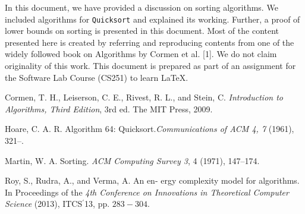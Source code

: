 \documentclass[a4paper, 10pt,twocolumn]{article}
\begin{document}
In this document, we have provided a discussion
on sorting algorithms. We included algorithms for
\texttt{Quicksort} and explained its working. Further, a
proof of lower bounds on sorting is presented in this
document. Most of the content presented here is
created by referring and reproducing contents from
one of the widely followed book on Algorithms by
Cormen et al. [1]. We do not claim originality of
this work. This document is prepared as part of an
assignment for the Software Lab Course (CS251) to
learn \LaTeX.


\begin{thebibliography}{25}
     Cormen, T. H., Leiserson, C. E., Rivest,
     R. L., and Stein, C. \textit{Introduction to Algorithms,
     Third Edition}, 3rd ed. The MIT Press,
    2009.

     Hoare, C. A. R. Algorithm 64: Quicksort.\textit{Communications of ACM 4, 7} (1961), 321–.

    Martin, W. A. Sorting. \textit{ACM Computing
        Survey 3}, 4 (1971), 147–174.

    Roy, S., Rudra, A., and Verma, A. An en-
        ergy complexity model for algorithms. In Proceedings of the \textit{4th Conference on Innovations  in Theoretical Computer Science} (2013), ITCS$^{'}$13, pp. $283-304$.


\end{thebibliography}
\end{document}
